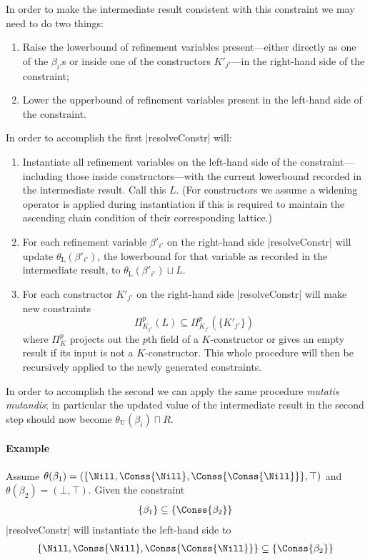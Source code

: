 In order to make the intermediate result consistent with this constraint we may need to do two things:
\begin{enumerate}
    \item Raise the lowerbound of refinement variables present---either directly as one of the $\beta_{i'}$s or inside one of the constructors $K'_{j'}$---in the right-hand side of the constraint;
    \item Lower the upperbound of refinement variables present in the left-hand side of the constraint.
\end{enumerate}

In order to accomplish the first |resolveConstr| will:
\begin{enumerate}
    \item Instantiate all refinement variables on the left-hand side of the constraint---including those inside constructors---with the current lowerbound recorded in the intermediate result. Call this $L$. (For constructors we assume a widening operator is applied during instantiation if this is required to maintain the ascending chain condition of their corresponding lattice.)
    \item For each refinement variable $\beta'_{i'}$ on the right-hand side |resolveConstr| will update $\theta_\mathrm{L}(\beta'_{i'})$, the lowerbound for that variable as recorded in the intermediate result, to $\theta_\mathrm{L}(\beta'_{i'}) \sqcup L$.
    \item For each constructor $K'_{j'}$ on the right-hand side |resolveConstr| will make new constraints \[ \Pi_{K_{j'}}^p(L) \subseteq \Pi_{K_{j'}}^p(\{K'_{j'}\}) \] where $\Pi_{K}^p$ projects out the $p$th field of a $K$-constructor or gives an empty result if its input is not a $K$-constructor. This whole procedure will then be recursively applied to the newly generated constraints.
\end{enumerate}

In order to accomplish the second we can apply the same procedure \emph{mutatis mutandis}; in particular the updated value of the intermediate result in the second step should now become $\theta_\mathrm{U}(\beta_i) \sqcap R$.

\paragraph{Example} Assume $\theta(\beta_1) = (\{\Nill, \Conss{\Nill}, \Conss{\Conss{\Nill}}\}, \top)$ and $\theta(\beta_2) = (\bot, \top)$. Given the constraint
\begin{eqnarray}
\{\beta_1\} \subseteq \{\Conss{\beta_2}\}\label{eqco}
\end{eqnarray}
|resolveConstr| will instantiate the left-hand side to 
\begin{eqnarray}
\{\Nill, \Conss{\Nill}, \Conss{\Conss{\Nill}}\} \subseteq \{\Conss{\beta_2}\}
\end{eqnarray}

